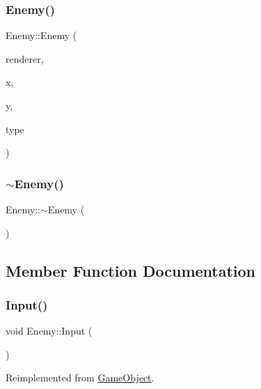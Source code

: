 \subsubsection{\texorpdfstring{Enemy()}{Enemy()}}
{\footnotesize\ttfamily Enemy\+::\+Enemy (\begin{DoxyParamCaption}\item[{S\+D\+L\+\_\+\+Renderer $\ast$}]{renderer,  }\item[{int}]{x,  }\item[{int}]{y,  }\item[{\mbox{\hyperlink{class_enemy_ae6c971b1c4da1335dfd6542dea6efecb}{E\+N\+E\+M\+Y\+\_\+\+T\+Y\+PE}}}]{type }\end{DoxyParamCaption})}

\mbox{\label{class_enemy_ac0eec4755e28c02688065f9657150ac3}} 
\subsubsection{\texorpdfstring{$\sim$\+Enemy()}{~Enemy()}}
{\footnotesize\ttfamily Enemy\+::$\sim$\+Enemy (\begin{DoxyParamCaption}{ }\end{DoxyParamCaption})}



\subsection{Member Function Documentation}
\mbox{\label{class_enemy_ad4958e67a70c706e37a80b285ac89854}} 
\subsubsection{\texorpdfstring{Input()}{Input()}}
{\footnotesize\ttfamily void Enemy\+::\+Input (\begin{DoxyParamCaption}{ }\end{DoxyParamCaption})\hspace{0.3cm}{\ttfamily [virtual]}}



Reimplemented from \mbox{\hyperlink{class_game_object_a430742cf91abb99337c556c88bef880a}{Game\+Object}}.

\mbox{\label{class_enemy_adcde768475970dae1e4c3e76fb59bc46}} 
